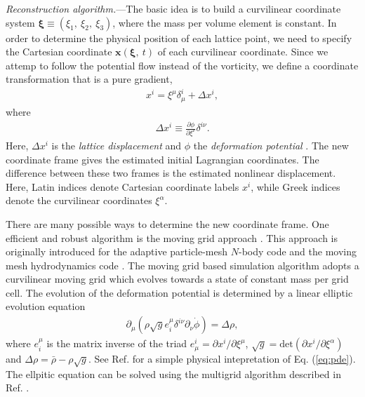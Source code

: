 \documentclass[aps,prd,twocolumn,superscriptaddress,groupedaddress,nofootinbib]{revtex4}  %
\newcommand{\mr}{\mathrm}
\newcommand{\bea}{\begin{eqnarray}}
\newcommand{\eea}{\end{eqnarray}}
\begin{document}
{\it Reconstruction algorithm.}---The basic idea is to build a curvilinear 
coordinate system $\bm{\xi}\equiv(\xi_1,\ \xi_2,\ \xi_3)$, where the mass per
volume element is constant. 
In order to determine the physical position of each lattice point, we need to 
specify the Cartesian coordinate $\bm{x}(\bm{\xi},\ t)$ of each curvilinear 
coordinate.
Since we attemp to follow the potential flow instead of the vorticity, we 
define a coordinate transformation that is a pure gradient,
\bea
\label{eq:trs}
x^i=\xi^\mu\delta^i_\mu+\Delta x^i,
\eea
where
\bea
\Delta x^i\equiv\frac{\partial\phi}{\partial\xi^\nu}\delta^{i\nu}.
\eea
Here, $\Delta{x}^i$ is the {\it lattice displacement} and $\phi$ the 
{\it deformation potential} \cite{1995ApJS..100..269P,1998ApJS..115...19P}. 
The new coordinate frame gives the estimated initial Lagrangian coordinates. 
The difference between these two frames is the estimated nonlinear displacement.
Here, Latin indices denote Cartesian coordinate labels $x^i$, while Greek 
indices denote the curvilinear coordinates $\xi^\alpha$.

There are many possible ways to determine the new coordinate frame. 
One efficient and robust algorithm is the moving grid approach \cite{1995ApJS..100..269P,1998ApJS..115...19P}.
This approach is originally introduced for the adaptive particle-mesh $N$-body 
code \cite{1995ApJS..100..269P} and the moving mesh hydrodynamics code
\cite{1998ApJS..115...19P}. 
The moving grid based simulation algorithm adopts a curvilinear moving grid
which evolves towards a state of constant mass per grid cell. 
The evolution of the deformation potential is determined by a linear elliptic
evolution equation
\bea
\label{eq:pde}
\partial_\mu(\rho\sqrt{g}e^\mu_i\delta^{i\nu}\partial_\nu\dot{\phi})=\Delta\rho,
\eea
where $e^\mu_i$ is the matrix inverse of the triad $e^i_\mu=\partial x^i/\partial\xi^\mu$, $\sqrt{g}=\mr{det}(\partial x^i/\partial \xi^\alpha)$ and 
$\Delta\rho=\bar{\rho}-\rho\sqrt{g}$. 
See Ref. \cite{1995ApJS..100..269P} for a simple physical intepretation of 
Eq. (\ref{eq:pde}).
The ellpitic equation can be solved using the multigrid algorithm described 
in Ref. \cite{1995ApJS..100..269P}.
\end{document}
